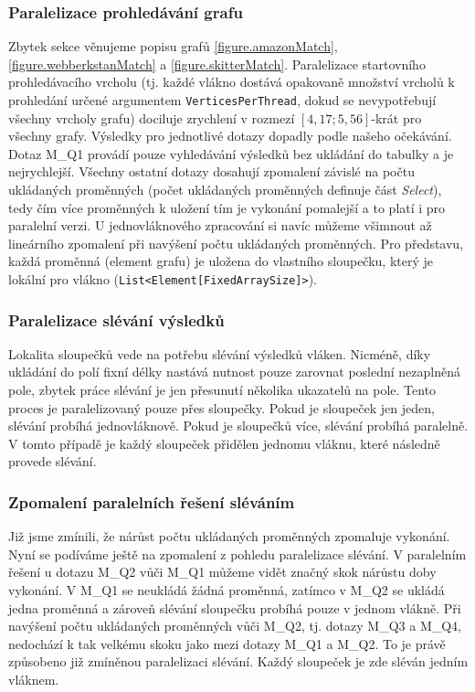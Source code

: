 \subsubsection{Paralelizace prohledávání grafu}

Zbytek sekce věnujeme popisu grafů \ref{figure.amazonMatch}, \ref{figure.webberkstanMatch} a \ref{figure.skitterMatch}. 
Paralelizace startovního prohledávacího vrcholu (tj. každé vlákno dostává opakovaně množství vrcholů k prohledání určené argumentem \verb+VerticesPerThread+, dokud se nevypotřebují všechny vrcholy grafu) dociluje zrychlení v rozmezí $[4,17; 5,56]$-krát pro všechny grafy.
Výsledky pro jednotlivé dotazy dopadly podle našeho očekávání. 
Dotaz M\_Q1 provádí pouze vyhledávání výsledků bez ukládání do tabulky a je nejrychlejší. 
Všechny ostatní dotazy dosahují zpomalení závislé na počtu ukládaných proměnných (počet ukládaných proměnných definuje část \textit{Select}), tedy čím více proměnných k uložení tím je vykonání pomalejší a to platí i pro paralelní verzi. 
U jednovláknového zpracování si navíc můžeme všimnout až lineárního zpomalení při navýšení počtu ukládaných proměnných.
Pro představu, každá proměnná (element grafu) je uložena do vlastního sloupečku, který je lokální pro vlákno (\verb+List<Element[FixedArraySize]>+). 

\subsubsection{Paralelizace slévání výsledků}

Lokalita sloupečků vede na potřebu slévání výsledků vláken.
Nicméně, díky ukládání do polí fixní délky nastává nutnost pouze zarovnat poslední nezaplněná pole, zbytek práce slévání je jen přesunutí několika ukazatelů na pole. 
Tento proces je paralelizovaný pouze přes sloupečky.
Pokud je sloupeček jen jeden, slévání probíhá jednovláknově.
Pokud je sloupečků více, slévání probíhá paralelně.
V tomto případě je každý sloupeček přidělen jednomu vláknu, které následně provede slévání. 

\subsubsection{Zpomalení paralelních řešení sléváním}

Již jsme zmínili, že nárůst počtu ukládaných proměnných zpomaluje vykonání.
Nyní se podíváme ještě na zpomalení z pohledu paralelizace slévání.
V paralelním řešení u dotazu M\_Q2 vůči M\_Q1 můžeme vidět značný skok nárůstu doby vykonání.
V M\_Q1 se neukládá žádná proměnná, zatímco v M\_Q2 se ukládá jedna proměnná a zároveň slévání sloupečku probíhá pouze v jednom vlákně.
Při navýšení počtu ukládaných proměnných vůči M\_Q2, tj. dotazy M\_Q3 a M\_Q4, nedochází k tak velkému skoku jako mezi dotazy M\_Q1 a M\_Q2.
To je právě způsobeno již zmíněnou paralelizaci slévání.
Každý sloupeček je zde sléván jedním vláknem.  

